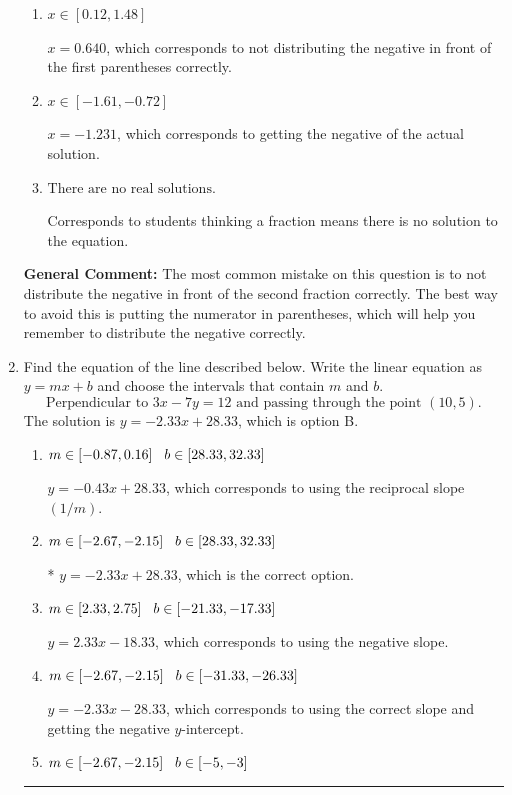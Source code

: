 \documentclass{extbook}[14pt]
\newcommand{\litem}[1]{\item #1

\rule{\textwidth}{0.4pt}}
\begin{document}
\begin{enumerate}
{\begin{enumerate}[label=\Alph*.]
$x = -0.640$, which corresponds to not distributing the negative in front of the second parentheses correctly.
\item \( x \in [0.12, 1.48] \)

$x = 0.640$, which corresponds to not distributing the negative in front of the first parentheses correctly.
\item \( x \in [-1.61, -0.72] \)

$x = -1.231$, which corresponds to getting the negative of the actual solution.
\item \( \text{There are no real solutions.} \)

Corresponds to students thinking a fraction means there is no solution to the equation.
\end{enumerate}

\textbf{General Comment:} The most common mistake on this question is to not distribute the negative in front of the second fraction correctly. The best way to avoid this is putting the numerator in parentheses, which will help you remember to distribute the negative correctly.
}
\litem{
Find the equation of the line described below. Write the linear equation as $ y=mx+b $ and choose the intervals that contain $m$ and $b$.
\[ \text{Perpendicular to } 3 x - 7 y = 12 \text{ and passing through the point } (10, 5). \]The solution is \( y = -2.33x + 28.33 \), which is option B.\begin{enumerate}[label=\Alph*.]
\item \( m \in [-0.87, 0.16] \hspace*{3mm} b \in [28.33, 32.33] \)

 $y = -0.43x + 28.33$, which corresponds to using the reciprocal slope $(1/m)$.
\item \( m \in [-2.67, -2.15] \hspace*{3mm} b \in [28.33, 32.33] \)

* $y = -2.33x + 28.33$, which is the correct option.
\item \( m \in [2.33, 2.75] \hspace*{3mm} b \in [-21.33, -17.33] \)

 $y = 2.33x - 18.33$, which corresponds to using the negative slope.
\item \( m \in [-2.67, -2.15] \hspace*{3mm} b \in [-31.33, -26.33] \)

 $y = -2.33x - 28.33$, which corresponds to using the correct slope and getting the negative $y$-intercept.
\item \( m \in [-2.67, -2.15] \hspace*{3mm} b \in [-5, -3] \)


\end{enumerate}}
\end{enumerate}
\end{document}
